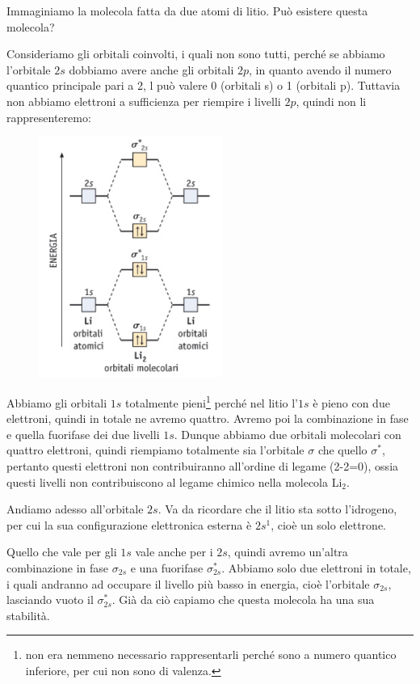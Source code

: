 Immaginiamo la molecola fatta da due atomi di litio. Può esistere questa molecola?

Consideriamo gli orbitali coinvolti, i quali non sono tutti, perché se abbiamo l'orbitale $2s$ dobbiamo avere anche gli orbitali $2p$, in quanto avendo il numero quantico principale pari a 2, l può valere 0 (orbitali s) o 1 (orbitali p). Tuttavia non abbiamo elettroni a sufficienza per riempire i livelli $2p$, quindi non li rappresenteremo:

\begin{figure}[htp]
    \centering
    \includegraphics[width=6cm]{immagini/orbitali_molecolari_Li_2.png}
\end{figure}

Abbiamo gli orbitali $1s$ totalmente pieni\footnote{non era nemmeno necessario rappresentarli perché sono a numero quantico inferiore, per cui non sono di valenza.} perché nel litio l'$1s$ è pieno con due elettroni, quindi in totale ne avremo quattro. Avremo poi la combinazione in fase e quella fuorifase dei due livelli $1s$. Dunque abbiamo due orbitali molecolari con quattro elettroni, quindi riempiamo totalmente sia l'orbitale $\sigma$ che quello $\sigma^*$, pertanto questi elettroni non contribuiranno all'ordine di legame (2-2=0), ossia questi livelli non contribuiscono al legame chimico nella molecola Li$_2$.

\vspace{0.2cm}Andiamo adesso all'orbitale $2s$. Va da ricordare che il litio sta sotto l'idrogeno, per cui la sua configurazione elettronica esterna è $2s^1$, cioè un solo elettrone.

Quello che vale per gli $1s$ vale anche per i $2s$, quindi avremo un'altra combinazione in fase $\sigma_{2s}$ e una fuorifase $\sigma_{2s}^*$. Abbiamo solo due elettroni in totale, i quali andranno ad occupare il livello più basso in energia, cioè l'orbitale $\sigma_{2s}$, lasciando vuoto il $\sigma_{2s}^*$. Già da ciò capiamo che questa molecola ha una sua stabilità.

